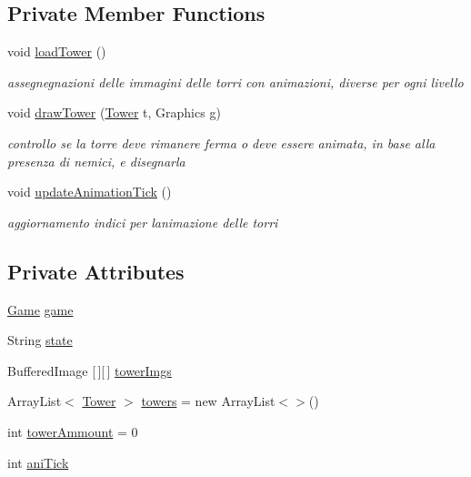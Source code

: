 \subsection*{Private Member Functions}
\begin{DoxyCompactItemize}
\item 
void \hyperlink{classmanagers_1_1_tower_manager_afcea12e616fbcfcaf7b40fba856f22ca}{load\+Tower} ()
\begin{DoxyCompactList}\small\item\em assegnegnazioni delle immagini delle torri con animazioni, diverse per ogni livello \end{DoxyCompactList}\item 
void \hyperlink{classmanagers_1_1_tower_manager_a2cbe196e347dcc9a69a4d3dfdbec72de}{draw\+Tower} (\hyperlink{classtowers_1_1_tower}{Tower} t, Graphics g)
\begin{DoxyCompactList}\small\item\em controllo se la torre deve rimanere ferma o deve essere animata, in base alla presenza di nemici, e disegnarla \end{DoxyCompactList}\item 
void \hyperlink{classmanagers_1_1_tower_manager_a5c2bac0f4b9a3ef4e30f60d4b0c3b951}{update\+Animation\+Tick} ()
\begin{DoxyCompactList}\small\item\em aggiornamento indici per l\textquotesingle{}animazione delle torri \end{DoxyCompactList}\end{DoxyCompactItemize}
\subsection*{Private Attributes}
\begin{DoxyCompactItemize}
\item 
\hyperlink{classprogetto_1_1_game}{Game} \hyperlink{classmanagers_1_1_tower_manager_ac6a5ed6191fcf3a5bf0445921feb4f48}{game}
\item 
String \hyperlink{classmanagers_1_1_tower_manager_a91ac952876f776b3fbbc8519e093fdbf}{state}
\item 
Buffered\+Image \mbox{[}$\,$\mbox{]}\mbox{[}$\,$\mbox{]} \hyperlink{classmanagers_1_1_tower_manager_a9e41697ad86c9524ce67f7e91358e17e}{tower\+Imgs}
\item 
Array\+List$<$ \hyperlink{classtowers_1_1_tower}{Tower} $>$ \hyperlink{classmanagers_1_1_tower_manager_a8018061adcbaafb8625d999c4e53a3aa}{towers} = new Array\+List$<$$>$()
\item 
int \hyperlink{classmanagers_1_1_tower_manager_a54fe3a936ed7614ffaa68bf973879711}{tower\+Ammount} = 0
\item 
int \hyperlink{classmanagers_1_1_tower_manager_a04d62de5f8367e549268b6c5540e1e97}{ani\+Tick}
\end{DoxyCompactItemize}


